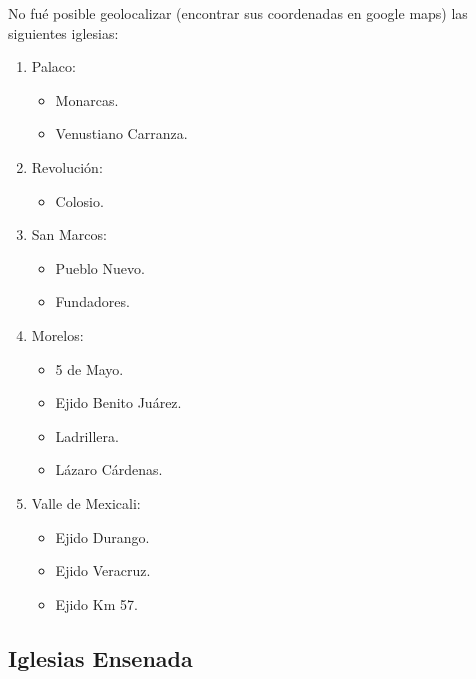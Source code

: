 \documentclass[]{article}
\providecommand{\tightlist}{%
  \setlength{\itemsep}{0pt}\setlength{\parskip}{0pt}}
\begin{document}
No fué posible geolocalizar (encontrar sus coordenadas en google maps)
las siguientes iglesias:

\begin{enumerate}
\def\labelenumi{\arabic{enumi}.}
\tightlist
\item
  Palaco:

  \begin{itemize}
  \tightlist
  \item
    Monarcas.
  \item
    Venustiano Carranza.
  \end{itemize}
\item
  Revolución:

  \begin{itemize}
  \tightlist
  \item
    Colosio.
  \end{itemize}
\item
  San Marcos:

  \begin{itemize}
  \tightlist
  \item
    Pueblo Nuevo.
  \item
    Fundadores.
  \end{itemize}
\item
  Morelos:

  \begin{itemize}
  \tightlist
  \item
    5 de Mayo.
  \item
    Ejido Benito Juárez.
  \item
    Ladrillera.
  \item
    Lázaro Cárdenas.
  \end{itemize}
\item
  Valle de Mexicali:

  \begin{itemize}
  \tightlist
  \item
    Ejido Durango.
  \item
    Ejido Veracruz.
  \item
    Ejido Km 57.
  \end{itemize}
\end{enumerate}

\subsection{Iglesias Ensenada}\label{iglesias-ensenada}
\end{document}
